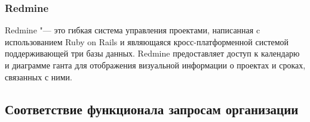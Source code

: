 \subsubsection{Redmine}
Redmine "--- это гибкая система управления проектами, написанная c
использованием Ruby on Rails и являющаяся кросс-платформенной системой
поддерживающей три базы данных. Redmine предоставляет доступ к календарю и
диаграмме ганта для отображения визуальной информации о проектах и сроках,
связанных с ними.

\subsection{Соответствие функционала запросам организации}
% 
% 
% 
% 
% 
% 
% 

